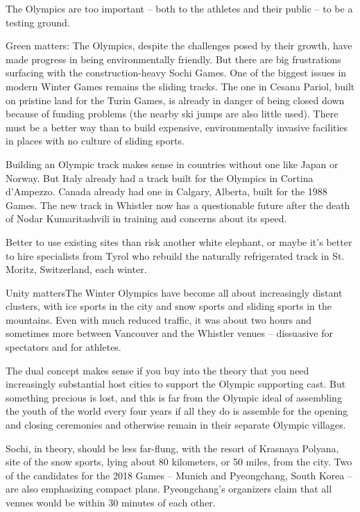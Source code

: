 ﻿\documentclass[12pt]{article}
\begin{document}
The Olympics are too important -- both to the athletes and their public -- to be a testing ground.

Green matters: The Olympics, despite the challenges posed by their growth, have made progress in
being environmentally friendly. But there are big frustrations surfacing with the construction-heavy
Sochi Games. One of the biggest issues in modern Winter Games remains the sliding tracks. The one in
Cesana Pariol, built on pristine land for the Turin Games, is already in danger of being closed down
because of funding problems (the nearby ski jumps are also little used). There must be a better way
than to build expensive, environmentally invasive facilities in places with no culture of sliding
sports.

Building an Olympic track makes sense in countries without one like Japan or Norway. But Italy
already had a track built for the Olympics in Cortina d'Ampezzo. Canada already had one in Calgary,
Alberta, built for the 1988 Games. The new track in Whistler now has a questionable future after the
death of Nodar Kumaritashvili in training and concerns about its speed.

Better to use existing sites than risk another white elephant, or maybe it's better to hire
specialists from Tyrol who rebuild the naturally refrigerated track in St. Moritz, Switzerland, each
winter.

Unity mattersThe Winter Olympics have become all about increasingly distant clusters, with ice
sports in the city and snow sports and sliding sports in the mountains. Even with much reduced
traffic, it was about two hours and sometimes more between Vancouver and the Whistler venues --
dissuasive for spectators and for athletes.

The dual concept makes sense if you buy into the theory that you need increasingly substantial host
cities to support the Olympic supporting cast. But something precious is lost, and this is far from
the Olympic ideal of assembling the youth of the world every four years if all they do is assemble
for the opening and closing ceremonies and otherwise remain in their separate Olympic villages.

Sochi, in theory, should be less far-flung, with the resort of Krasnaya Polyana, site of the snow
sports, lying about 80 kilometers, or 50 miles, from the city. Two of the candidates for the 2018
Games -- Munich and Pyeongchang, South Korea -- are also emphasizing compact plans. Pyeongchang's
organizers claim that all venues would be within 30 minutes of each other.
\end{document}
